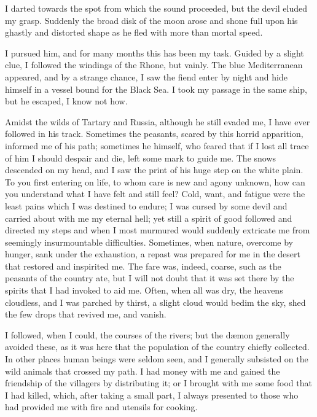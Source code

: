 \documentclass[12pt,openright]{book}
\begin{document}
I darted towards the spot from which the sound proceeded, but the devil eluded my grasp. Suddenly the broad disk of the moon arose and shone full upon his ghastly and distorted shape as he fled with more than mortal speed.

I pursued him, and for many months this has been my task. Guided by a slight clue, I followed the windings of the Rhone, but vainly. The blue Mediterranean appeared, and by a strange chance, I saw the fiend enter by night and hide himself in a vessel bound for the Black Sea. I took my passage in the same ship, but he escaped, I know not how.

Amidst the wilds of Tartary and Russia, although he still evaded me, I have ever followed in his track. Sometimes the peasants, scared by this horrid apparition, informed me of his path; sometimes he himself, who feared that if I lost all trace of him I should despair and die, left some mark to guide me. The snows descended on my head, and I saw the print of his huge step on the white plain. To you first entering on life, to whom care is new and agony unknown, how can you understand what I have felt and still feel? Cold, want, and fatigue were the least pains which I was destined to endure; I was cursed by some devil and carried about with me my eternal hell; yet still a spirit of good followed and directed my steps and when I most murmured would suddenly extricate me from seemingly insurmountable difficulties. Sometimes, when nature, overcome by hunger, sank under the exhaustion, a repast was prepared for me in the desert that restored and inspirited me. The fare was, indeed, coarse, such as the peasants of the country ate, but I will not doubt that it was set there by the spirits that I had invoked to aid me. Often, when all was dry, the heavens cloudless, and I was parched by thirst, a slight cloud would bedim the sky, shed the few drops that revived me, and vanish.

I followed, when I could, the courses of the rivers; but the dæmon generally avoided these, as it was here that the population of the country chiefly collected. In other places human beings were seldom seen, and I generally subsisted on the wild animals that crossed my path. I had money with me and gained the friendship of the villagers by distributing it; or I brought with me some food that I had killed, which, after taking a small part, I always presented to those who had provided me with fire and utensils for cooking.
\end{document}
